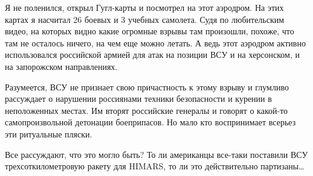 {Я не поленился, открыл Гугл-карты и посмотрел на этот аэродром. На этих картах
я насчитал 26 боевых и 3 учебных самолета. Судя по любительским видео, на
которых видно какие огромные взрывы там произошли, похоже, что там не осталось
ничего, на чем еще можно летать. А ведь этот аэродром активно использовался
российской армией для атак на позиции ВСУ и на херсонском, и на запорожском
направлениях.

Разумеется, ВСУ не признает свою причастность к этому взрыву и глумливо
рассуждает о нарушении россиянами техники безопасности и курении в неположенных
местах. Им вторят российские генералы и говорят о какой-то самопроизвольной
детонации боеприпасов. Но мало кто воспринимает всерьез эти ритуальные пляски.

Все рассуждают, что это могло быть? То ли американцы все-таки поставили ВСУ
трехсоткилометровую ракету для HIMARS, то ли это действительно партизаны…

}
